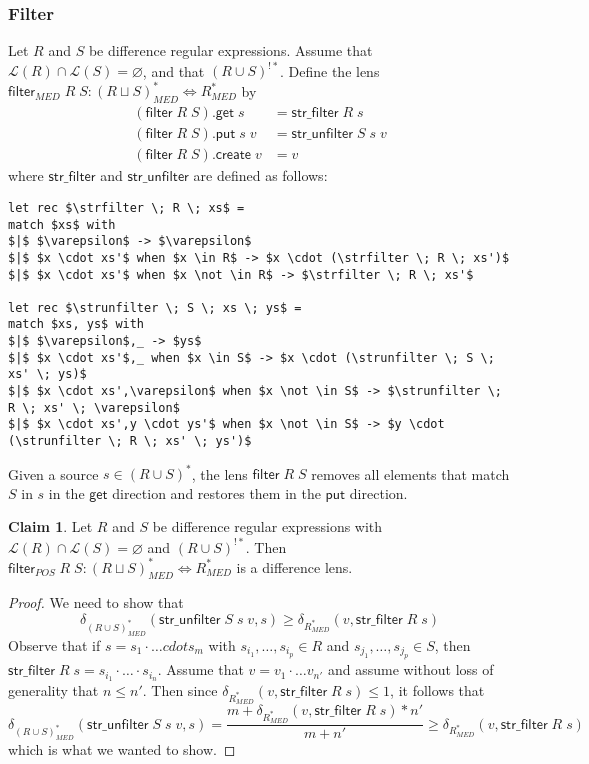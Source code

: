 \documentclass[acmsmall,review,anonymous]{acmart}\settopmatter{printfolios=true,printccs=false,printacmref=false}
\theoremstyle{definition}
\newtheorem{claim}{Claim}
\newcommand{\kw}[1]{\ensuremath{\mathsf{#1}}\xspace}
\newcommand{\get}{\ensuremath{\kw{get}}\xspace}
\newcommand{\pput}{\ensuremath{\kw{put}}\xspace}
\newcommand{\create}{\ensuremath{\kw{create}}\xspace}
\newcommand{\filter}{\ensuremath{\kw{filter}}\xspace}
\newcommand{\strfilter}{\ensuremath{\kw{str\_filter}}\xspace}
\newcommand{\strunfilter}{\ensuremath{\kw{str\_unfilter}}\xspace}
\begin{document}
\subsubsection{Filter}
Let $R$ and $S$ be difference regular expressions. Assume that $\mathcal{L}(R) \cap \mathcal{L}(S) = \varnothing$, and that $(R \cup S)^{!*}$. Define the lens $\filter_{MED} \; R \; S : (R \sqcup S)^*_{MED} \Leftrightarrow R^*_{MED}$ by
\begin{align*}
(\filter \; R \; S).\get \; s &= \strfilter \; R \; s\\
(\filter \; R \; S).\pput \; s \; v &= \strunfilter \; S \; s \;v\\
(\filter \; R \; S).\create \; v &= v
\end{align*}
where \strfilter and \strunfilter are defined as follows:
\begin{lstlisting}[mathescape=true]
let rec $\strfilter \; R \; xs$ = 
match $xs$ with
$|$ $\varepsilon$ -> $\varepsilon$
$|$ $x \cdot xs'$ when $x \in R$ -> $x \cdot (\strfilter \; R \; xs')$
$|$ $x \cdot xs'$ when $x \not \in R$ -> $\strfilter \; R \; xs'$

let rec $\strunfilter \; S \; xs \; ys$ = 
match $xs, ys$ with
$|$ $\varepsilon$,_ -> $ys$
$|$ $x \cdot xs'$,_ when $x \in S$ -> $x \cdot (\strunfilter \; S \; xs' \; ys)$
$|$ $x \cdot xs',\varepsilon$ when $x \not \in S$ -> $\strunfilter \; R \; xs' \; \varepsilon$
$|$ $x \cdot xs',y \cdot ys'$ when $x \not \in S$ -> $y \cdot (\strunfilter \; R \; xs' \; ys')$
\end{lstlisting}
Given a source $s \in (R \cup S)^*$, the lens $\filter \; R \; S$ removes all elements that match $S$ in $s$ in the \get direction and restores them in the \pput direction.
\begin{claim}
Let $R$ and $S$ be difference regular expressions with $\mathcal{L}(R) \cap \mathcal{L}(S) = \varnothing$ and $(R \cup S)^{!*}$. Then $\filter_{POS} \; R \; S : (R \sqcup S)^*_{MED} \Leftrightarrow R^*_{MED}$ is a difference lens.
\end{claim}
\begin{proof}
We need to show that
$$
\delta_{(R \cup S)^*_{MED}} (\strunfilter \; S \; s \; v, s) \geq \delta_{R^*_{MED}}(v, \strfilter \; R \; s)$$
Observe that if $s = s_1 \cdot \ldots cdot s_m$ with $s_{i_1}, \ldots, s_{i_p} \in R$ and $s_{j_1}, \ldots, s_{j_p} \in S$, then $\strfilter \; R \; s = s_{i_1} \cdot \ldots \cdot s_{i_n}$. Assume that $v = v_1 \cdot \ldots v_{n'}$ and assume without loss of generality that $n \leq n'$. Then since $\delta_{R^*_{MED}}(v, \strfilter \; R \; s) \leq 1$, it follows that
$$
\delta_{(R \cup S)^*_{MED}} (\strunfilter \; S \; s \; v, s) = \frac{m + \delta_{R^*_{MED}}(v, \strfilter \; R \; s) * n'}{m+n'} \geq \delta_{R^*_{MED}}(v, \strfilter \; R \; s)
$$
which is what we wanted to show.
\end{proof}
\end{document}
